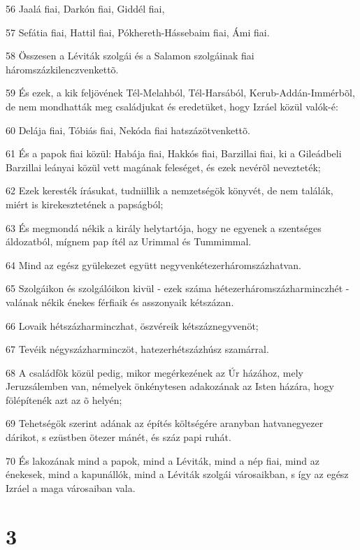 \par 56 Jaalá fiai, Darkón fiai, Giddél fiai,
\par 57 Sefátia fiai, Hattil fiai, Pókhereth-Hássebaim fiai, Ámi fiai.
\par 58 Összesen a Léviták szolgái és a Salamon szolgáinak fiai háromszázkilenczvenkettõ.
\par 59 És ezek, a kik feljövének Tél-Melahból, Tél-Harsából, Kerub-Addán-Immérbõl, de nem mondhatták meg családjukat és eredetüket, hogy Izráel közül valók-é:
\par 60 Delája fiai, Tóbiás fiai, Nekóda fiai hatszázötvenkettõ.
\par 61 És a papok fiai közül: Habája fiai, Hakkós fiai, Barzillai fiai, ki a Gileádbeli Barzillai leányai közül vett magának feleséget, és ezek nevérõl nevezteték;
\par 62 Ezek keresték írásukat, tudniillik a nemzetségök könyvét, de nem találák, miért is kirekesztetének a papságból;
\par 63 És megmondá nékik a király helytartója, hogy ne egyenek a szentséges áldozatból, mígnem pap ítél az Urimmal és  Tummimmal.
\par 64 Mind az egész gyülekezet együtt negyvenkétezerháromszázhatvan.
\par 65 Szolgáikon és szolgálóikon kivül - ezek száma hétezerháromszázharminczhét - valának nékik énekes férfiaik és asszonyaik kétszázan.
\par 66 Lovaik hétszázharminczhat, öszvéreik kétszáznegyvenöt;
\par 67 Tevéik négyszázharminczöt, hatezerhétszázhúsz szamárral.
\par 68 A családfõk közül pedig, mikor megérkezének az Úr házához, mely Jeruzsálemben van, némelyek önkénytesen adakozának az Isten házára, hogy fölépítenék azt az õ helyén;
\par 69 Tehetségök szerint adának az építés költségére aranyban hatvanegyezer dárikot, s ezüstben ötezer mánét, és száz papi ruhát.
\par 70 És lakozának mind a papok, mind a Léviták, mind a nép fiai, mind az énekesek, mind a kapunállók, mind a Léviták szolgái városaikban, s így az egész Izráel a maga városaiban vala.

\chapter{3}

